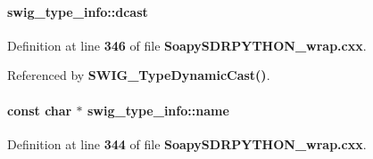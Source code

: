\paragraph[{dcast}]{ swig\+\_\+type\+\_\+info\+::dcast}\label{structswig__type__info_a07df4bedf85be77b23756b531b60e0dd}


Definition at line {\bf 346} of file {\bf Soapy\+S\+D\+R\+P\+Y\+T\+H\+O\+N\+\_\+wrap.\+cxx}.



Referenced by {\bf S\+W\+I\+G\+\_\+\+Type\+Dynamic\+Cast()}.

\paragraph[{name}]{\setlength{\rightskip}{0pt plus 5cm}const char $\ast$ swig\+\_\+type\+\_\+info\+::name}\label{structswig__type__info_aa6c9f9ed3037043b6d346162cf932daf}


Definition at line {\bf 344} of file {\bf Soapy\+S\+D\+R\+P\+Y\+T\+H\+O\+N\+\_\+wrap.\+cxx}.



